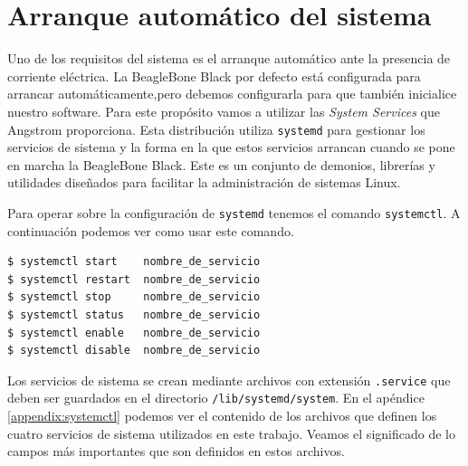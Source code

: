 \section{Arranque automático del sistema}
	Uno de los requisitos del sistema es el arranque automático ante la presencia de corriente eléctrica. La BeagleBone Black por defecto está
	configurada para arrancar automáticamente,pero debemos configurarla para que también inicialice nuestro software. Para este propósito vamos a
	utilizar las \emph{System Services}\cite{AngSystemctl} que Angstrom proporciona. Esta distribución utiliza \texttt{systemd}\cite{systemdWiki}
	para gestionar los servicios de sistema y la forma en la que estos servicios arrancan cuando se pone en marcha la BeagleBone Black. Este es un
	conjunto de demonios, librerías y utilidades diseñados para facilitar la administración de sistemas Linux.
	\par
	Para operar sobre la configuración de \texttt{systemd} tenemos el comando \texttt{systemctl}. A continuación podemos ver como usar este
	comando.
	\begin{lstlisting}[style=myBash]
$ systemctl start    nombre_de_servicio
$ systemctl restart  nombre_de_servicio
$ systemctl stop     nombre_de_servicio
$ systemctl status   nombre_de_servicio
$ systemctl enable   nombre_de_servicio
$ systemctl disable  nombre_de_servicio
	\end{lstlisting}
	\par
	Los servicios de sistema se crean mediante archivos con extensión \texttt{.service} que deben ser guardados en el directorio
	\texttt{/lib/systemd/system}. En el apéndice \ref{appendix:systemctl} podemos ver el contenido de los archivos que definen los cuatro
	servicios de sistema utilizados en este trabajo. Veamos el significado de lo campos más importantes que son definidos en estos archivos.
